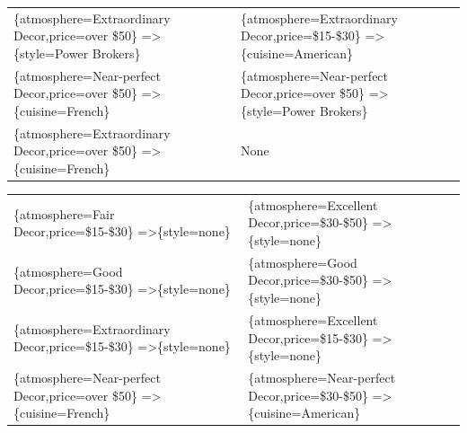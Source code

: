 \documentclass[letterpaper,10pt]{article}
\begin{document}
\begin{appendices}
\begin{table}[h]
\begin{adjustbox}{max width=\textwidth}
\begin{tabular}{ll}
\{atmosphere=Extraordinary Decor,price=over \$50\} =\textgreater \{style=Power Brokers\} & \{atmosphere=Extraordinary Decor,price=\$15-\$30\} =\textgreater \{cuisine=American\} \\ 
\{atmosphere=Near-perfect Decor,price=over \$50\} =\textgreater \{cuisine=French\} & \{atmosphere=Near-perfect Decor,price=over \$50\} =\textgreater \{style=Power Brokers\} \\ 
\{atmosphere=Extraordinary Decor,price=over \$50\} =\textgreater \{cuisine=French\} & None \\ 

\end{tabular}
\end{adjustbox}
\begin{adjustbox}{max width=\textwidth}
\begin{tabular}{ll}
\{atmosphere=Fair Decor,price=\$15-\$30\} =\textgreater \{style=none\} & \{atmosphere=Excellent Decor,price=\$30-\$50\} =\textgreater \{style=none\} \\ 
\{atmosphere=Good Decor,price=\$15-\$30\} =\textgreater \{style=none\} & \{atmosphere=Good Decor,price=\$30-\$50\} =\textgreater \{style=none\} \\ 
\{atmosphere=Extraordinary Decor,price=\$15-\$30\} =\textgreater \{style=none\} & \{atmosphere=Excellent Decor,price=\$15-\$30\} =\textgreater \{style=none\} \\ 
\{atmosphere=Near-perfect Decor,price=over \$50\} =\textgreater \{cuisine=French\} & \{atmosphere=Near-perfect Decor,price=\$30-\$50\} =\textgreater \{cuisine=American\} \\ 

\end{tabular}
\end{adjustbox}
\end{table}
\end{appendices}
\end{document}
